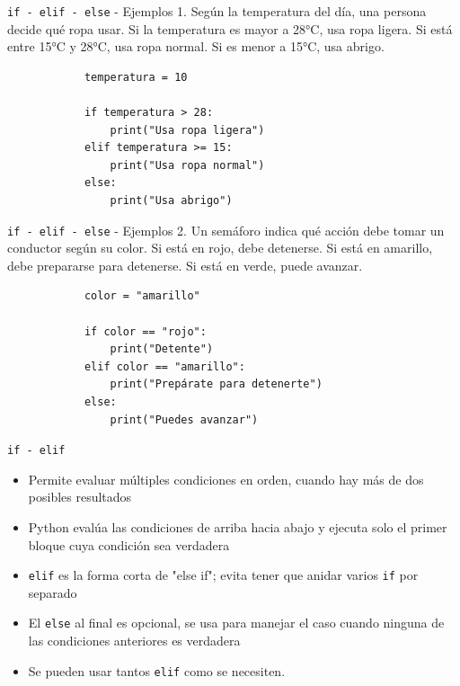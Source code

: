 \documentclass{beamer}
\begin{document}
    \begin{frame}[fragile,t]{\texttt{if - elif - else} - Ejemplos}
        1. Según la temperatura del día, una persona decide qué ropa usar. 
        Si la temperatura es mayor a 28°C, usa ropa ligera. Si está entre 15°C y 28°C, 
        usa ropa normal. Si es menor a 15°C, usa abrigo.
        
        \begin{verbatim}
            temperatura = 10

            if temperatura > 28:
                print("Usa ropa ligera")
            elif temperatura >= 15:
                print("Usa ropa normal")
            else:
                print("Usa abrigo")
        \end{verbatim}
    \end{frame}

    \begin{frame}[fragile,t]{\texttt{if - elif - else} - Ejemplos}
        2. Un semáforo indica qué acción debe tomar un conductor según su color. 
        Si está en rojo, debe detenerse. Si está en amarillo, debe prepararse para detenerse. 
        Si está en verde, puede avanzar.
        \begin{verbatim}
            color = "amarillo"

            if color == "rojo":
                print("Detente")
            elif color == "amarillo":
                print("Prepárate para detenerte")
            else:
                print("Puedes avanzar")
        \end{verbatim}
    \end{frame}

    \begin{frame}[fragile,t]{\texttt{if - elif}}
        \begin{itemize}
            \item Permite evaluar múltiples condiciones en orden, 
            cuando hay más de dos posibles resultados
            \item Python evalúa las condiciones de arriba hacia abajo y 
            ejecuta solo el primer bloque cuya condición sea verdadera
            \item \texttt{elif} es la forma corta de "else if";
            evita tener que anidar varios \texttt{if} por separado
            \item El \texttt{else} al final es opcional, se usa para
            manejar el caso cuando ninguna de las condiciones anteriores es verdadera
            \item Se pueden usar tantos \texttt{elif} como se necesiten.
        \end{itemize}
    \end{frame}
\end{document}
